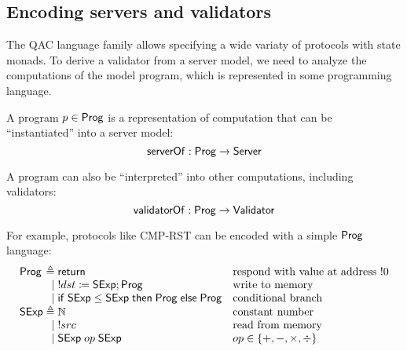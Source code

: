 \subsection{Encoding servers and validators}
The QAC language family allows specifying a wide variaty of protocols with state
monads.  To derive a validator from a server model, we need to analyze the
computations of the model program, which is represented in some programming
language.

\begin{definition}
  A program $p\in\mathsf{Prog}$ is a representation of computation that can be
  ``instantiated'' into a server model:
  \[\mathsf{serverOf}:\mathsf{Prog}\to\mathsf{Server}\]
  
  A program can also be ``interpreted'' into other computations, including
  validators:
  \[\mathsf{validatorOf}:\mathsf{Prog}\to\mathsf{Validator}\]
\end{definition}

For example, protocols like CMP-RST can be encoded with a simple $\mathsf{Prog}$
language:
\[\begin{array}{l@{\;}r@{\;}ll}
\Prog&\triangleq&\Return&\text{respond with value at address $!0$}\\
&\mid&!dst\coloneqq\Sexp;\Prog&\text{write to memory}\\\null
&\mid&\If\Sexp\le\Sexp\Then\Prog\Else\Prog&\text{conditional branch}\\
\Sexp&\triangleq&\Nat&\text{constant number}\\
&\mid&!src&\text{read from memory}\\
&\mid&\Sexp\;op\;\Sexp&op\in\{+,-,\times,\div\}
\end{array}
\]

